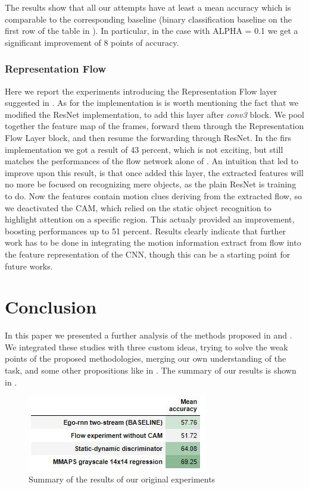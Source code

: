 \documentclass[10pt,twocolumn,hidelinks,letterpaper]{article}
\begin{document}
The results show that all our attempts have at least a mean accuracy which is comparable to the corresponding baseline (binary classification baseline on the first row of the table in ). In particular, in the case with ALPHA = 0.1 we get a significant improvement of 8 points of accuracy.

\subsubsection{Representation Flow}

Here we report the experiments introducing the Representation Flow layer suggested in
\cite{reprflow}. As for the implementation is is worth mentioning the fact that
we modified the ResNet implementation, to add this layer after \textit{conv3} block. We pool together the feature map of the frames, forward them through the Representation Flow Layer block, and then resume the forwarding through ResNet.
In the firs implementation we got a result of 43 percent, which is not exciting, but
still matches the performances of the flow network alone of \cite{egornn}. An intuition that led to improve upon this result, is that once added this layer, the extracted features will no more be focused on recognizing mere objects, as the plain ResNet is training to do. Now the features contain motion clues deriving from the extracted flow, so we deactivated the CAM, which relied on the static object recognition to highlight attention on a specific region. This actualy provided an improvement, boosting performances up to 51 percent.
Results clearly indicate that further work has to be done in integrating the motion information extract from flow into the feature representation of the CNN, though this
can be a starting point for future works.

\section{Conclusion}

In this paper we presented a further analysis of the methods proposed in \cite{egornn} and \cite{sparnet}. We integrated these studies with three custom ideas, trying to solve the weak points of the proposed methodologies, merging our own understanding of the
task, and some other propositions like in \cite{reprflow}. The summary of our results is shown in .


\begin{figure}[t]
  \centering
  \includegraphics[width=.8\linewidth]{images/summary_table.jpg}
  \caption{Summary of the results of our original experiments}
  \label{summary_table}
\end{figure}
\end{document}
